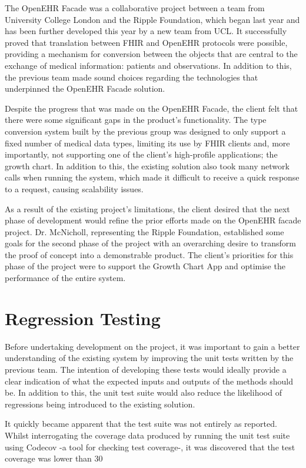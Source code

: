 \documentclass[sigconf]{acmart}
\begin{document}
The OpenEHR Facade was a collaborative project between a team from University College London and the Ripple Foundation, which began last year and has been further developed this year by a new team from UCL. It successfully proved that translation between FHIR and OpenEHR protocols were possible, providing a mechanism for conversion between the objects that are central to the exchange of medical information: patients and observations. In addition to this, the previous team made sound choices regarding the technologies that underpinned the OpenEHR Facade solution.

Despite the progress that was made on the OpenEHR Facade, the client felt that there were some significant gaps in the product’s functionality. The type conversion system built by the previous group was designed to only support a fixed number of medical data types, limiting its use by FHIR clients and, more importantly, not supporting one of the client’s high-profile applications; the growth chart. In addition to this, the existing solution also took many network calls when running the system, which made it difficult to receive a quick response to a request, causing scalability issues.

As a result of the existing project’s limitations, the client desired that the next phase of development would refine the prior efforts made on the OpenEHR facade project. Dr. McNicholl, representing the Ripple Foundation, established some goals for the second phase of the project with an overarching desire to transform the proof of concept into a demonstrable product. The client’s priorities for this phase of the project were to support the Growth Chart App and optimise the performance of the entire system.


\section{Regression Testing}
Before undertaking development on the project, it was important to gain a better understanding of the existing system by improving the unit tests written by the previous team. The intention of developing these tests would ideally provide a clear indication of what the expected inputs and outputs of the methods should be. In addition to this, the unit test suite would also reduce the likelihood of regressions being introduced to the existing solution.

It quickly became apparent that the test suite was not entirely as reported. Whilst interrogating the coverage data produced by running the unit test suite using Codecov -a tool for checking test coverage-, it was discovered that the test coverage was lower than 30%
\end{document}
